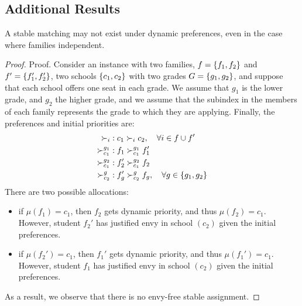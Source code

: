 \begin{APPENDICES}

\section{Additional Results}\label{app: additional results}

    \begin{theorem}\label{thm: no stable matching}
      A stable matching may not exist under dynamic preferences, even in the case where families independent.
    \end{theorem}
    \begin{proof}{Proof.}
      Consider an instance with two families, \(f = \left\{f_1,f_2\right\}\) and \(f'=\left\{f_1', f_2'\right\}\), two schools \(\left\{c_1, c_2\right\}\) with two grades \(G = \left\{g_1, g_2\right\}\), and suppose that each school offers one seat in each grade. We assume that \(g_1\) is the lower grade, and \(g_2\) the higher grade, and we assume that the subindex in the members of each family represents the grade to which they are applying. Finally, the preferences and initial priorities are:
      \begin{equation}
        \begin{aligned}
          \succ_i & : c_1 \succ_i c_2, \quad \forall i\in f\cup f' \\
          \succ_{c_1}^{g_1}&: f_1 \succ_{c_1}^{g_1} f_1' \\
          \succ_{c_1}^{g_2}&: f_2' \succ_{c_1}^{g_2} f_2 \\
          \succ_{c_2}^g &: f_g' \succ_{c_2}^g f_g, \quad \forall g \in \left\{g_1, g_2\right\}
        \end{aligned}
      \end{equation}
      There are two possible allocations:
      \begin{itemize}
        \item if \(\mu(f_1) = c_1\), then \(f_2\) gets dynamic priority, and thus \(\mu(f_2) = c_1\). However, student \(f_2'\) has justified envy in school \((c_2)\) given the initial preferences.
        \item if \(\mu(f_2') = c_1\), then \(f_1'\) gets dynamic priority, and thus \(\mu(f_1') = c_1\). However, student \(f_1\) has justified envy in school \((c_2)\) given the initial preferences.
      \end{itemize}
      As a result, we observe that there is no envy-free stable assignment.
    \end{proof}


\end{APPENDICES}
